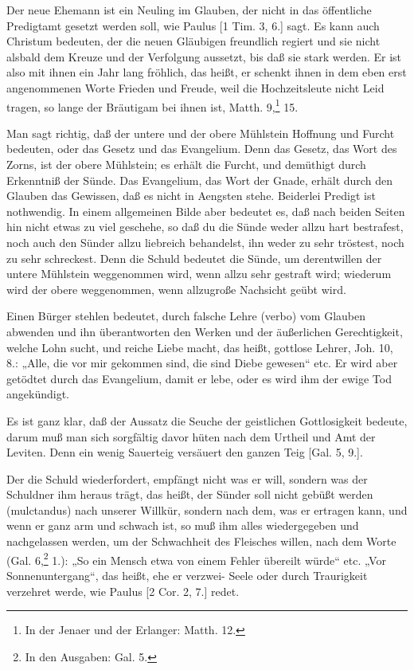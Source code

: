 Der neue Ehemann ist ein Neuling im Glauben, der nicht in das öffentliche Predigtamt gesetzt werden soll, wie Paulus [1 Tim. 3, 6.] sagt. Es kann auch Christum bedeuten, der die neuen Gläubigen freundlich regiert und sie nicht alsbald dem Kreuze und der Verfolgung aussetzt, bis daß sie stark werden. Er ist also mit ihnen ein Jahr lang fröhlich, das heißt, er schenkt ihnen in dem eben erst angenommenen Worte Frieden und Freude, weil die Hochzeitsleute nicht Leid tragen, so lange der Bräutigam bei ihnen ist, Matth. 9,\footnote{In der Jenaer und der Erlanger: Matth. 12.} 15.

Man sagt richtig, daß der untere und der obere Mühlstein Hoffnung und Furcht bedeuten, oder das Gesetz und das Evangelium. Denn das Gesetz, das Wort des Zorns, ist der obere Mühlstein; es erhält die Furcht, und demüthigt durch Erkenntniß der Sünde. Das Evangelium, das Wort der Gnade, erhält durch den Glauben das Gewissen, daß es nicht in Aengsten stehe. Beiderlei Predigt ist nothwendig. In einem allgemeinen Bilde aber bedeutet es, daß nach beiden Seiten hin nicht etwas zu viel geschehe, so daß du die Sünde weder allzu hart bestrafest, noch auch den Sünder allzu liebreich behandelst, ihn weder zu sehr tröstest, noch zu sehr schreckest. Denn die Schuld bedeutet die Sünde, um derentwillen der untere Mühlstein weggenommen wird, wenn allzu sehr gestraft wird; wiederum wird der obere weggenommen, wenn allzugroße Nachsicht geübt wird.

Einen Bürger stehlen bedeutet, durch falsche Lehre (verbo) vom Glauben abwenden und ihn überantworten den Werken und der äußerlichen Gerechtigkeit, welche Lohn sucht, und reiche Liebe macht, das heißt, gottlose Lehrer, Joh. 10, 8.: „Alle, die vor mir gekommen sind, die sind Diebe gewesen“ etc. Er wird aber getödtet durch das Evangelium, damit er lebe, oder es wird ihm der ewige Tod angekündigt.

Es ist ganz klar, daß der Aussatz die Seuche der geistlichen Gottlosigkeit bedeute, darum muß man sich sorgfältig davor hüten nach dem Urtheil und Amt der Leviten. Denn ein wenig Sauerteig versäuert den ganzen Teig [Gal. 5, 9.].

Der die Schuld wiederfordert, empfängt nicht was er will, sondern was der Schuldner ihm heraus trägt, das heißt, der Sünder soll nicht gebüßt werden (mulctandus) nach unserer Willkür, sondern nach dem, was er ertragen kann, und wenn er ganz arm und schwach ist, so muß ihm alles wiedergegeben und nachgelassen werden, um der Schwachheit des Fleisches willen, nach dem Worte (Gal. 6,\footnote{In den Ausgaben: Gal. 5.} 1.): „So ein Mensch etwa von einem Fehler übereilt würde“ etc. „Vor Sonnenuntergang“, das heißt, ehe er verzwei-
Seele oder durch Traurigkeit verzehret werde, wie Paulus [2 Cor. 2, 7.] redet.

